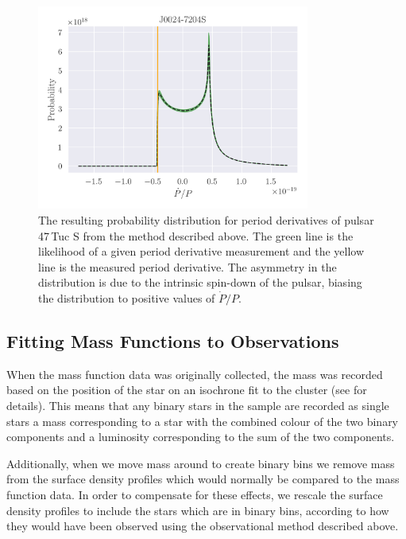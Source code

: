 \begin{figure}
    \centering
    \includegraphics[width=0.8\textwidth]{figures/pulsar-likelihood.png}
    \caption{The resulting probability distribution for period derivatives of pulsar 47\,Tuc S from
        the method described above. The green line is the likelihood of a given period derivative
        measurement and the yellow line is the measured period derivative. The asymmetry in the
        distribution is due to the intrinsic spin-down of the pulsar, biasing the distribution to
        positive values of $\dot{P}/P$.}
    \label{fig:pulsar-likelihood}
\end{figure}




\subsection{Fitting Mass Functions to Observations}

When the mass function data was originally collected, the mass was recorded based on the position of
the star on an isochrone fit to the cluster (see \citealt{Sollima2017} for details). This means that
any binary stars in the sample are recorded as single stars a mass corresponding to a star with the
combined colour of the two binary components and a luminosity corresponding to the sum of the two
components.

Additionally, when we move mass around to create binary bins we remove mass from the surface density
profiles which would normally be compared to the mass function data. In order to compensate for
these effects, we rescale the surface density profiles to include the stars which are in binary
bins, according to how they would have been observed using the observational method described above.

